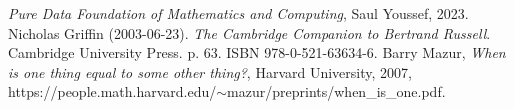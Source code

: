 \documentclass[11pt]{article}
\begin{document}
\begin{thebibliography}{10}
 {\it Pure Data Foundation of Mathematics and Computing}, Saul Youssef, 2023.
 Nicholas Griffin (2003-06-23). {\it The Cambridge Companion to Bertrand Russell}. Cambridge University Press. p. 63. ISBN 978-0-521-63634-6.
 Barry Mazur, {\it When is one thing equal to some other thing?}, Harvard University, 2007,  {\rm https://people.math.harvard.edu/}$\sim${\rm mazur/preprints/when\_is\_one.pdf}. 
\end{thebibliography}
\end{document}
